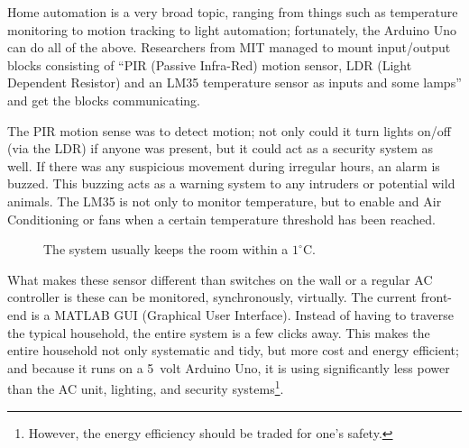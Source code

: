 \documentclass[11pt,letterpaper,twocolumn]{article}
\begin{document}
Home automation is a very broad topic, ranging from things such as temperature monitoring to motion tracking to light automation; fortunately, the Arduino Uno can do all of the above. Researchers from MIT managed to mount input/output blocks consisting of ``PIR (Passive Infra-Red) motion sensor, LDR (Light Dependent Resistor) and an LM35 temperature sensor as inputs and some lamps'' and get the blocks communicating.

The PIR motion sense was to detect motion; not only could it turn lights on/off (via the LDR) if anyone was present, but it could act as a security system as well. If there was any suspicious movement during irregular hours, an alarm is buzzed. This buzzing acts as a warning system to any intruders or potential wild animals. The LM35 is not only to monitor temperature, but to enable and Air Conditioning or fans when a certain temperature threshold has been reached.

\begin{figure}
    \centering

    \caption{The system usually keeps the room within a $1^{\circ}\text{C}$.}
\end{figure}

What makes these sensor different than switches on the wall or a regular AC controller is these can be monitored, synchronously, virtually. The current front-end is a MATLAB GUI (Graphical User Interface). Instead of having to traverse the typical household, the entire system is a few clicks away. This makes the entire household not only systematic and tidy, but more cost and energy efficient; and because it runs on a \SI{5}{volt} Arduino Uno, it is using significantly less power than the AC unit, lighting, and security systems\footnote{However, the energy efficiency should be traded for one's safety.}.
\end{document}
